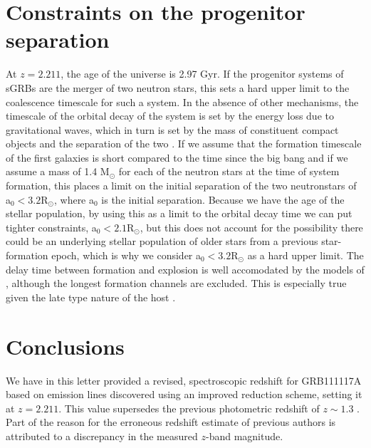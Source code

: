 \documentclass{aa}    %
\begin{document}
\section{Constraints on the progenitor separation}

At $z = 2.211$, the age of the universe is 2.97 Gyr. If the progenitor systems of sGRBs are the merger of two neutron stars, this sets a hard upper limit to the coalescence timescale for such a system. In the absence of other mechanisms, the timescale of the orbital decay of the system is set by the energy loss due to gravitational waves, which in turn is set by the mass of constituent compact objects and the separation of the two \citep{Postnov2014}. If we assume that the formation timescale of the first galaxies is short compared to the time since the big bang \citep{Richard2011} and if we assume a mass of 1.4 M$_\odot$ for each of the neutron stars at the time of system formation, this places a limit on the initial separation of the two neutronstars of a$_0 < 3.2 $R$_\odot$, where a$_0$ is the initial separation. Because we have the age of the stellar population, by using this as a limit to the orbital decay time we can put tighter constraints, a$_0 < 2.1 $R$_\odot$, but this does not account for the possibility there could be an underlying stellar population of older stars from a previous star-formation epoch, which is why we consider a$_0 < 3.2 $R$_\odot$ as a hard upper limit. The delay time between formation and explosion is well accomodated by the models of \citet{Belczynski2006}, although the longest formation channels are excluded. This is especially true given the late type nature of the host \citep{OShaughnessy2008}.

\section{Conclusions}

We have in this letter provided a revised, spectroscopic redshift for GRB111117A based on emission lines discovered using an improved reduction scheme, setting it at $z = 2.211$. This value supersedes the previous photometric redshift of $z \sim 1.3$ \citep{Margutti2012, Sakamoto2013}. Part of the reason for the erroneous redshift estimate of previous authors is attributed to a discrepancy in the measured $z$-band magnitude. 
\end{document}
